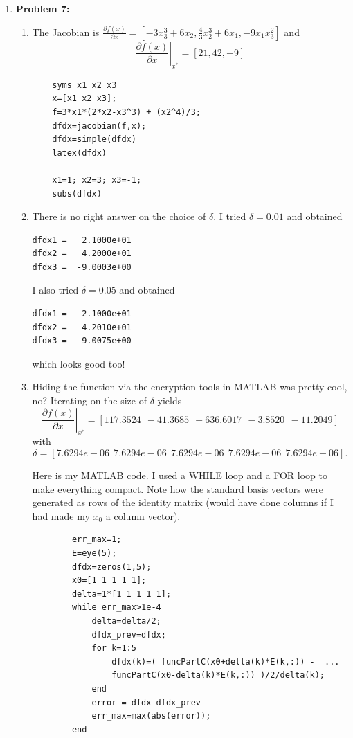 \documentclass[letterpaper]{article}
\begin{document}
\begin{enumerate}
\begin{enumerate}
\item Anything is fine.
\end{enumerate}

\item \noindent \textbf{Problem 7:}

\begin{enumerate}
\setlength{\itemsep}{.1in}
\renewcommand{\labelenumi}{(\alph{enumi})}
\item The Jacobian is $\frac{\partial f (x)}{\partial x}=\left[   - 3x_3^3 + 6x_2, \frac{4}{3}x_2^3 + 6 x_1, -9x_1x_3^2 \right]$ and
$$\left.  \frac{\partial f (x)}{\partial x}\right|_{x^*} = [ 21, 42, -9]$$
\begin{verbatim}
    syms x1 x2 x3
    x=[x1 x2 x3];
    f=3*x1*(2*x2-x3^3) + (x2^4)/3;
    dfdx=jacobian(f,x);
    dfdx=simple(dfdx)
    latex(dfdx)

    x1=1; x2=3; x3=-1;
    subs(dfdx)
\end{verbatim}

\item  There is no right answer on the choice of $\delta$. I tried $\delta=0.01$ and obtained
\begin{verbatim}
dfdx1 =   2.1000e+01
dfdx2 =   4.2000e+01
dfdx3 =  -9.0003e+00
\end{verbatim}
I also tried $\delta=0.05$ and obtained
\begin{verbatim}
dfdx1 =   2.1000e+01
dfdx2 =   4.2010e+01
dfdx3 =  -9.0075e+00
  \end{verbatim}
  which looks good too!

\item Hiding the function via the encryption tools in MATLAB was pretty cool, no? Iterating on the size of $\delta$ yields
$$ \left.  \frac{\partial f (x)}{\partial x}\right|_{x^*}=  [ 117.3524~~  -41.3685 ~~-636.6017   ~~-3.8520  ~~-11.2049]$$
with $$ \delta = [ 7.6294e-06  ~~ 7.6294e-06   ~~7.6294e-06  ~~ 7.6294e-06   ~~7.6294e-06].$$

Here is my MATLAB code. I used a WHILE loop and a FOR loop to make everything compact. Note how the standard basis vectors were generated as rows of the identity matrix (would have done columns if I had made my $x_0$ a column vector).

\begin{verbatim}
        err_max=1;
        E=eye(5);
        dfdx=zeros(1,5);
        x0=[1 1 1 1 1];
        delta=1*[1 1 1 1 1];
        while err_max>1e-4
            delta=delta/2;
            dfdx_prev=dfdx;
            for k=1:5
                dfdx(k)=( funcPartC(x0+delta(k)*E(k,:)) -  ...
                funcPartC(x0-delta(k)*E(k,:)) )/2/delta(k);
            end
            error = dfdx-dfdx_prev
            err_max=max(abs(error));
        end


\end{verbatim}
\end{enumerate}
\end{enumerate}
\end{document}
